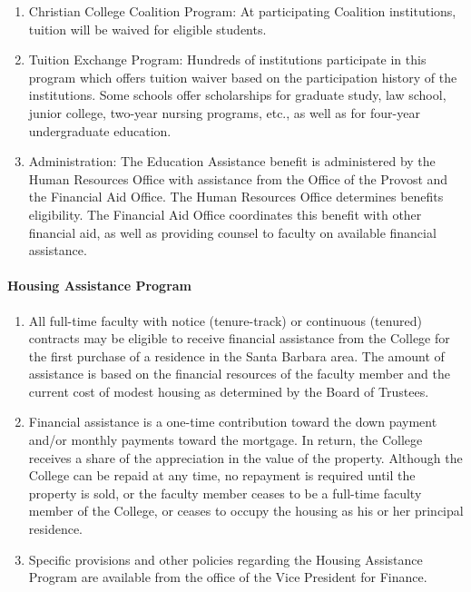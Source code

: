 \documentclass[letterpaper, 11pt]{article}
\begin{document}
\begin{enumerate}[label=\alph*)]
{\begin{enumerate}[label=\arabic*)]
							\item{Christian College Coalition Program:  At participating Coalition institutions, tuition will be waived for eligible students.}
							\item{Tuition Exchange Program:  Hundreds of institutions participate in this program which offers tuition waiver based on the participation history of the institutions. Some schools offer scholarships for graduate study, law school, junior college, two-year nursing programs, etc., as well as for four-year undergraduate education.}
							\item{Administration:}
							The Education Assistance benefit is administered by the Human Resources Office with assistance from the Office of the Provost and the Financial Aid Office.  The Human Resources Office determines benefits eligibility.  The Financial Aid Office coordinates this benefit with other financial aid, as well as providing counsel to faculty on available financial assistance.
						\end{enumerate}
					}
				\end{enumerate}
			\paragraph{Housing Assistance Program}
				\begin{enumerate}[label=\alph*)]
					\item{All full-time faculty with notice (tenure-track) or continuous (tenured) contracts may be eligible to receive financial assistance from the College for the first purchase of a residence in the Santa Barbara area.  The amount of assistance is based on the financial resources of the faculty member and the current cost of modest housing as determined by the Board of Trustees.}
					\item{Financial assistance is a one-time contribution toward the down payment and/or monthly payments toward the mortgage.  In return, the College receives a share of the appreciation in the value of the property.  Although the College can be repaid at any time, no repayment is required until the property is sold, or the faculty member ceases to be a full-time faculty member of the College, or ceases to occupy the housing as his or her principal residence.}
					\item{Specific provisions and other policies regarding the Housing Assistance Program are available from the office of the Vice President for Finance.}
				\end{enumerate}
\end{document}
